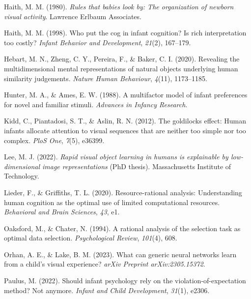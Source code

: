 \documentclass[10pt, letterpaper]{article}
\newenvironment{CSLReferences}%
  {}%
  {\par}
\begin{document}
\begin{CSLReferences}{1}{0}
\leavevmode{}%
Haith, M. M. (1980). \emph{Rules that babies look by: The organization
of newborn visual activity}. Lawrence Erlbaum Associates.

\leavevmode{}%
Haith, M. M. (1998). Who put the cog in infant cognition? Is rich
interpretation too costly? \emph{Infant Behavior and Development},
\emph{21}(2), 167--179.

\leavevmode{}%
Hebart, M. N., Zheng, C. Y., Pereira, F., \& Baker, C. I. (2020).
Revealing the multidimensional mental representations of natural objects
underlying human similarity judgements. \emph{Nature Human Behaviour},
\emph{4}(11), 1173--1185.

\leavevmode{}%
Hunter, M. A., \& Ames, E. W. (1988). A multifactor model of infant
preferences for novel and familiar stimuli. \emph{Advances in Infancy
Research}.

\leavevmode{}%
Kidd, C., Piantadosi, S. T., \& Aslin, R. N. (2012). The goldilocks
effect: Human infants allocate attention to visual sequences that are
neither too simple nor too complex. \emph{PloS One}, \emph{7}(5),
e36399.

\leavevmode{}%
Lee, M. J. (2022). \emph{Rapid visual object learning in humans is
explainable by low-dimensional image representations} (PhD thesis).
Massachusetts Institute of Technology.

\leavevmode{}%
Lieder, F., \& Griffiths, T. L. (2020). Resource-rational analysis:
Understanding human cognition as the optimal use of limited
computational resources. \emph{Behavioral and Brain Sciences},
\emph{43}, e1.

\leavevmode{}%
Oaksford, M., \& Chater, N. (1994). A rational analysis of the selection
task as optimal data selection. \emph{Psychological Review},
\emph{101}(4), 608.

\leavevmode{}%
Orhan, A. E., \& Lake, B. M. (2023). What can generic neural networks
learn from a child's visual experience? \emph{arXiv Preprint
arXiv:2305.15372}.

\leavevmode{}%
Paulus, M. (2022). Should infant psychology rely on the
violation-of-expectation method? Not anymore. \emph{Infant and Child
Development}, \emph{31}(1), e2306.


\end{CSLReferences}
\end{document}
